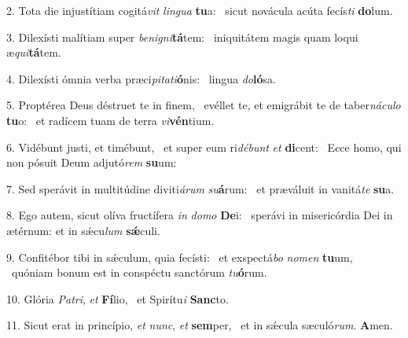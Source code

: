 2. Tota die injustítiam cogitá\textit{vit} \textit{lin}\textit{gua} \textbf{tu}a: \ast\  sicut novácula acúta fecís\textit{ti} \textbf{do}lum.\

3. Dilexísti malítiam super \textit{be}\textit{ni}\textit{gni}\textbf{tá}tem: \ast\  iniquitátem magis quam loqui æ\textit{qui}\textbf{tá}tem.\

4. Dilexísti ómnia verba præci\textit{pi}\textit{ta}\textit{ti}\textbf{ó}nis: \ast\  lingua \textit{do}\textbf{ló}sa.\

5. Proptérea Deus déstruet te in finem, \dag\  evéllet te, et emigrábit te de taber\textit{ná}\textit{cu}\textit{lo} \textbf{tu}o: \ast\  et radícem tuam de terra \textit{vi}\textbf{vén}tium.\

6. Vidébunt justi, et timébunt, \dag\  et super eum ri\textit{dé}\textit{bunt} \textit{et} \textbf{di}cent: \ast\  Ecce homo, qui non pósuit Deum adjutó\textit{rem} \textbf{su}um:\

7. Sed sperávit in multitúdine diviti\textit{á}\textit{rum} \textit{su}\textbf{á}rum: \ast\  et præváluit in vanitá\textit{te} \textbf{su}a.\

8. Ego autem, sicut olíva fructífera \textit{in} \textit{do}\textit{mo} \textbf{De}i: \ast\  sperávi in misericórdia Dei in ætérnum: et in sǽcu\textit{lum} \textbf{sǽ}culi.\

9. Confitébor tibi in sǽculum, quia fecísti: \dag\  et exspectá\textit{bo} \textit{no}\textit{men} \textbf{tu}um, \ast\  quóniam bonum est in conspéctu sanctórum \textit{tu}\textbf{ó}rum.\

10. Glória \textit{Pa}\textit{tri}, \textit{et} \textbf{Fí}lio, \ast\  et Spirítu\textit{i} \textbf{Sanc}to.\

11. Sicut erat in princípio, \textit{et} \textit{nunc}, \textit{et} \textbf{sem}per, \ast\  et in sǽcula sæculó\textit{rum}. \textbf{A}men.\

